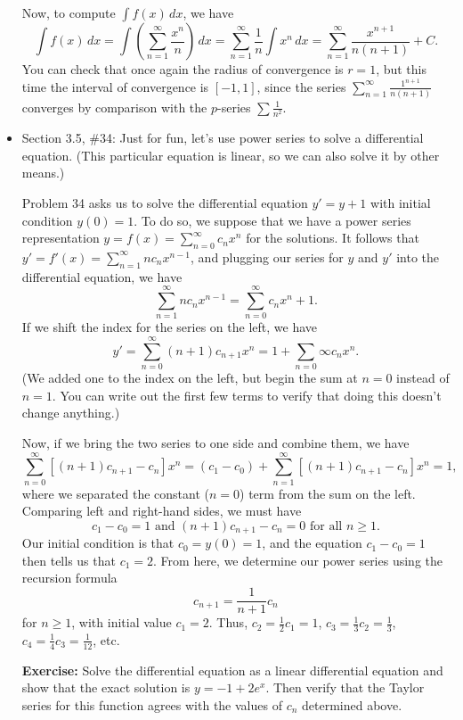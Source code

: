 \documentclass[12pt]{article}
\newcommand{\di}{\displaystyle}
\begin{document}
\begin{itemize}
Now, to compute $\int f(x)\,dx$, we have
\[
 \int f(x)\,dx = \int\left(\sum_{n=1}^\infty\frac{x^n}{n}\right)\,dx = \sum_{n=1}^\infty \frac{1}{n}\int x^n\,dx = \sum_{n=1}^\infty\frac{x^{n+1}}{n(n+1)}+C.
\]
You can check that once again the radius of convergence is $r=1$, but this time the interval of convergence is $[-1,1]$, since the series $\di\sum_{n=1}^\infty \frac{1^{n+1}}{n(n+1)}$ converges by comparison with the $p$-series $\di\sum\frac{1}{n^2}$.

\item Section 3.5, \#34: Just for fun, let's use power series to solve a differential equation. (This particular equation is linear, so we can also solve it by other means.)

Problem 34 asks us to solve the differential equation $y'=y+1$ with initial condition $y(0)=1$. To do so, we suppose that we have a power series representation $y = f(x) = \sum_{n=0}^\infty c_nx^n$ for the solutions. It follows that $y' = f'(x) = \sum_{n=1}^\infty nc_n x^{n-1}$, and plugging our series for $y$ and $y'$ into the differential equation, we have
\[
 \sum_{n=1}^\infty nc_n x^{n-1} = \sum_{n=0}^\infty c_n x^n + 1 .
\]
If we shift the index for the series on the left, we have
\[
 y' = \sum_{n=0}^\infty(n+1)c_{n+1}x^n = 1+\sum_{n=0}\infty c_nx^n.
\]
(We added one to the index on the left, but begin the sum at $n=0$ instead of $n=1$. You can write out the first few terms to verify that doing this doesn't change anything.)

Now, if we bring the two series to one side and combine them, we have
\[
 \sum_{n=0}^\infty[(n+1)c_{n+1}-c_n]x^n = (c_1-c_0) + \sum_{n=1}^\infty[(n+1)c_{n+1}-c_n]x^n = 1,
\]
where we separated the constant ($n=0$) term from the sum on the left. Comparing left and right-hand sides, we must have
\[
 c_1-c_0 =1 \text{ and } (n+1)c_{n+1}-c_n = 0 \text{ for all } n\geq 1.
\]
Our initial condition is that $c_0 = y(0) = 1$, and the equation $c_1-c_0=1$ then tells us that $c_1=2$. From here, we determine our power series using the recursion formula
\[
 c_{n+1}=\frac{1}{n+1}c_n
\]
for $n\geq 1$, with initial value $c_1=2$. Thus, $c_2 = \frac{1}{2}c_1 = 1$, $c_3 = \frac{1}{3}c_2 = \frac{1}{3}$, $c_4 = \frac{1}{4}c_3 = \frac{1}{12}$, etc.

\textbf{Exercise:} Solve the differential equation as a linear differential equation and show that the exact solution is $y = -1+2e^x$. Then verify that the Taylor series for this function agrees with the values of $c_n$ determined above.


\end{itemize}
\end{document}
